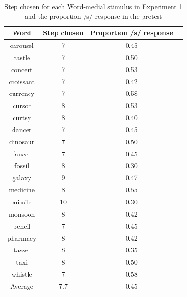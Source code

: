 \begin{table}[ht]
\caption{Step chosen for each Word-medial stimulus in Experiment 1 and the proportion /s/ response in the pretest}
\label{tbl:exp1srespfinal}
\centering
\begin{tabular}{cccc}
\toprule
 Word & Step chosen & Proportion /s/ response \\
\midrule
carousel & 7 & 0.45 \\
castle & 7 & 0.50 \\
concert & 7 & 0.53 \\
croissant & 7 & 0.42 \\
currency & 7 & 0.58 \\
cursor & 8 & 0.53 \\
 curtsy & 8 & 0.40 \\
 dancer & 7 & 0.45 \\
 dinosaur & 7 & 0.50 \\
 faucet & 7 & 0.45 \\
 fossil & 8 & 0.30 \\
 galaxy & 9 & 0.47 \\
 medicine & 8 & 0.55 \\
 missile & 10 & 0.30 \\
 monsoon & 8 & 0.42 \\
 pencil & 7 & 0.45 \\
pharmacy & 8 & 0.42 \\
tassel & 8 & 0.35 \\
 taxi & 8 & 0.50 \\
 whistle & 7 & 0.58 \\
\midrule
 Average   & 7.7 & 0.45 \\

\bottomrule
\end{tabular}
\end{table}

